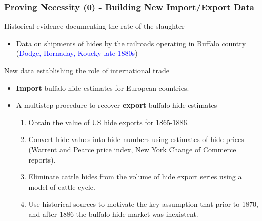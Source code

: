 \documentclass[aspectratio=169, 12pt, final]{beamer}
\begin{document}


\begin{frame}
\frametitle{Proving Necessity (0) - Building New Import/Export Data}	
Historical evidence documenting the rate of the slaughter
\begin{itemize}
	\item Data on shipments of hides by the railroads operating in Buffalo country (\textcolor{blue}{Dodge, Hornaday, Koucky late 1880s})
\end{itemize}
New data establishing the role of international trade
\begin{itemize}
	\item \textbf{Import} buffalo hide estimates for European countries.
	\item A multistep procedure to recover \textbf{export} buffalo hide estimates
\begin{enumerate}[1)]
	\item Obtain the value of US hide exports for 1865-1886.
	\item Convert hide values into hide numbers using estimates of hide prices (Warrent and Pearce price index, New York Change of Commerce reports).
	\item Eliminate cattle hides from the volume of hide export series using a model of cattle cycle.
	\item Use historical sources to motivate the key assumption that prior to 1870, and after 1886 the buffalo hide market was inexistent.
\end{enumerate}
\end{itemize}
\end{frame}
\end{document}
